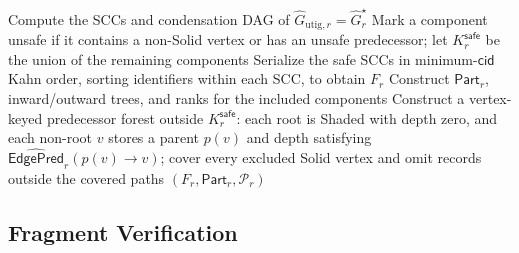 \begin{algorithm}[h!]
\caption{\textsc{SafeExtract}: Expanded Safe Extraction}
\label{alg:safe-extract}
\footnotesize
{}
Compute the SCCs and condensation DAG of
$\widehat G_{\mathrm{utig},r}=\widehat G_r^\star$\;
Mark a component unsafe if it contains a non-Solid vertex or has an unsafe predecessor; let $K_r^{\mathsf{safe}}$ be the union of the remaining components\;
Serialize the safe SCCs in minimum-$\mathsf{cid}$ Kahn order, sorting identifiers within each SCC, to obtain $F_r$\;
Construct $\mathsf{Part}_r$, inward/outward trees, and ranks for the included components\;
Construct a vertex-keyed predecessor forest outside $K_r^{\mathsf{safe}}$:
each root is Shaded with depth zero, and each non-root $v$ stores a parent $p(v)$ and depth satisfying $\widehat{\mathsf{EdgePred}}_r(p(v)\to v)$;
cover every excluded Solid vertex and omit records outside the covered paths\;
\KwRet $(F_r,\mathsf{Part}_r,\mathcal P_r)$
\end{algorithm}

\subsection{Fragment Verification}

